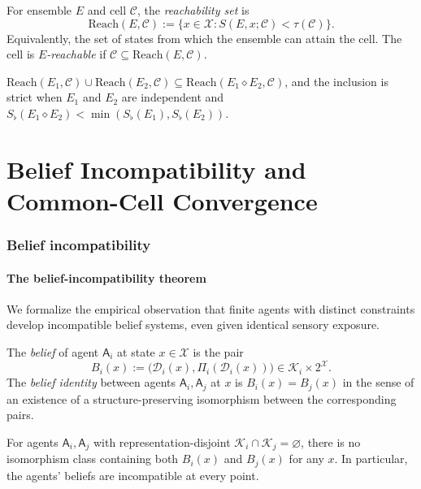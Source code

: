 \documentclass[11pt,a4paper]{article}
\newcommand{\K}{\mathcal{K}}
\newcommand{\D}{\mathcal{D}}
\newcommand{\X}{\mathcal{X}}
\newcommand{\Cell}{\mathcal{C}}
\newcommand{\agent}{\mathsf{A}}
\newcommand{\Sfloor}{S_{\flat}}
\newcommand{\Reach}{\mathrm{Reach}}
\newcommand{\Compose}{\diamond}
\begin{document}
\begin{definition}\label{def:reach}
For ensemble $E$ and cell $\Cell$, the \emph{reachability set} is
\[
\Reach(E,\Cell):=\{x\in\X:S(E,x;\Cell)<\tau(\Cell)\}.
\]
Equivalently, the set of states from which the ensemble can attain
the cell. The cell is \emph{$E$-reachable} if
$\Cell\subseteq\Reach(E,\Cell)$.
\end{definition}

\begin{proposition}\label{prop:reach-comp}
$\Reach(E_1,\Cell)\cup\Reach(E_2,\Cell)\subseteq
\Reach(E_1\Compose E_2,\Cell)$,
and the inclusion is strict when $E_1$ and $E_2$ are independent and
$\Sfloor(E_1\Compose E_2)<\min(\Sfloor(E_1),\Sfloor(E_2))$.
\end{proposition}

\part{Belief Incompatibility and Common-Cell Convergence}

\section{Belief incompatibility}
\label{sec:incompatibility}

\subsection{The belief-incompatibility theorem}

We formalize the empirical observation that finite agents with distinct
constraints develop incompatible belief systems, even given identical
sensory exposure.

\begin{definition}[Belief]\label{def:belief}
The \emph{belief} of agent $\agent_i$ at state $x\in\X$ is the pair
\[
B_i(x):=\bigl(\D_i(x),\Pi_i(\D_i(x))\bigr)\in\K_i\times 2^\X.
\]
The \emph{belief identity} between agents $\agent_i,\agent_j$ at $x$ is
$B_i(x)=B_j(x)$ in the sense of an existence of a structure-preserving
isomorphism between the corresponding pairs.
\end{definition}

\begin{theorem}\label{thm:incompat}
For agents $\agent_i,\agent_j$ with representation-disjoint
$\K_i\cap\K_j=\varnothing$, there is no isomorphism class containing
both $B_i(x)$ and $B_j(x)$ for any $x$. In particular, the agents'
beliefs are incompatible at every point.
\end{theorem}
\end{document}
